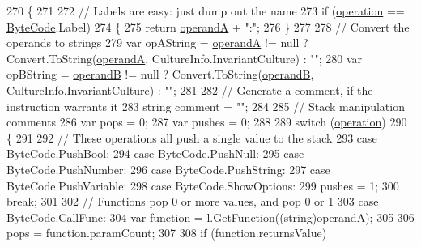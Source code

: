 \begin{DoxyCode}
270         \{
271 
272             \textcolor{comment}{// Labels are easy: just dump out the name}
273             \textcolor{keywordflow}{if} (\hyperlink{a00119_a566bf5f7198cc353ea5c3710cb3a31cb}{operation} == \hyperlink{a00051_ad5dfb6ee68ca7469623ad3e459f98894}{ByteCode}.Label)
274             \{
275                 \textcolor{keywordflow}{return} \hyperlink{a00119_ab5d386faa0d3dbc23db80f8e62706afd}{operandA} + \textcolor{stringliteral}{":"};
276             \}
277 
278             \textcolor{comment}{// Convert the operands to strings}
279             var opAString = \hyperlink{a00119_ab5d386faa0d3dbc23db80f8e62706afd}{operandA} != null ? Convert.ToString(\hyperlink{a00119_ab5d386faa0d3dbc23db80f8e62706afd}{operandA}, 
      CultureInfo.InvariantCulture) : \textcolor{stringliteral}{""};
280             var opBString = \hyperlink{a00119_a56348c6fe7eb919b7277afc06e5b224a}{operandB} != null ? Convert.ToString(\hyperlink{a00119_a56348c6fe7eb919b7277afc06e5b224a}{operandB}, 
      CultureInfo.InvariantCulture) : \textcolor{stringliteral}{""};
281 
282             \textcolor{comment}{// Generate a comment, if the instruction warrants it}
283             \textcolor{keywordtype}{string} comment = \textcolor{stringliteral}{""};
284 
285             \textcolor{comment}{// Stack manipulation comments}
286             var pops = 0;
287             var pushes = 0;
288 
289             \textcolor{keywordflow}{switch} (\hyperlink{a00119_a566bf5f7198cc353ea5c3710cb3a31cb}{operation})
290             \{
291 
292                 \textcolor{comment}{// These operations all push a single value to the stack}
293                 \textcolor{keywordflow}{case} ByteCode.PushBool:
294                 \textcolor{keywordflow}{case} ByteCode.PushNull:
295                 \textcolor{keywordflow}{case} ByteCode.PushNumber:
296                 \textcolor{keywordflow}{case} ByteCode.PushString:
297                 \textcolor{keywordflow}{case} ByteCode.PushVariable:
298                 \textcolor{keywordflow}{case} ByteCode.ShowOptions:
299                     pushes = 1;
300                     \textcolor{keywordflow}{break};
301 
302                 \textcolor{comment}{// Functions pop 0 or more values, and pop 0 or 1}
303                 \textcolor{keywordflow}{case} ByteCode.CallFunc:
304                     var \textcolor{keyword}{function} = l.GetFunction((string)operandA);
305 
306                     pops = function.paramCount;
307 
308                     \textcolor{keywordflow}{if} (\textcolor{keyword}{function}.returnsValue)

\end{DoxyCode}
